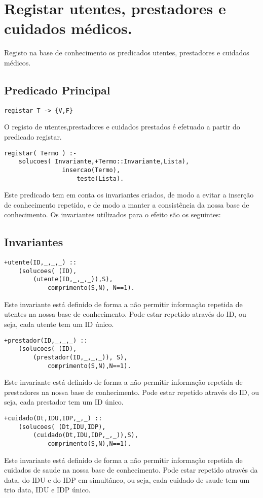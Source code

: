 \documentclass{report}
\def\titulo#1{\section{#1}}
\begin{document}
\titulo{Registar utentes, prestadores e cuidados médicos.}

Registo na base de conhecimento os predicados utentes, prestadores e cuidados médicos. 

\subsection{Predicado Principal}
 
\begin{verbatim}
registar T -> {V,F}
\end{verbatim}
 
O registo de utentes,prestadores e cuidados prestados é efetuado a partir do predicado registar. 
 

\begin{verbatim}
registar( Termo ) :-
    solucoes( Invariante,+Termo::Invariante,Lista), 
                insercao(Termo), 
                    teste(Lista).
\end{verbatim}
 
Este predicado tem em conta os invariantes criados, de modo a evitar a inserção de conhecimento repetido, e de modo a manter a consistência da nossa base de conhecimento. Os invariantes utilizados para o efeito são os seguintes:    

\subsection{Invariantes}

\begin{verbatim}
+utente(ID,_,_,_) :: 
    (solucoes( (ID), 
        (utente(ID,_,_,_)),S), 
            comprimento(S,N), N==1).
\end{verbatim}
Este invariante está definido de forma a não permitir informação repetida de utentes na nossa base de conhecimento. Pode estar repetido através do ID, ou seja, cada utente tem um ID único.
\bigbreak

\begin{verbatim}
+prestador(ID,_,_,_) :: 
    (solucoes( (ID), 
        (prestador(ID,_,_,_)), S),
            comprimento(S,N),N==1).
\end{verbatim}
Este invariante está definido de forma a não permitir informação repetida de prestadores na nossa base de conhecimento. Pode estar repetido através do ID, ou seja, cada prestador tem um ID único.
\bigbreak

\begin{verbatim}
+cuidado(Dt,IDU,IDP,_,_) :: 
    (solucoes( (Dt,IDU,IDP),
        (cuidado(Dt,IDU,IDP,_,_)),S),
            comprimento(S,N),N==1).
\end{verbatim}
Este invariante está definido de forma a não permitir informação repetida de cuidados de saude na nossa base de conhecimento. Pode estar repetido através da data, do IDU e do IDP em simultâneo, ou seja, cada cuidado de saude tem um trio data, IDU e IDP único.
\bigbreak
\end{document}
